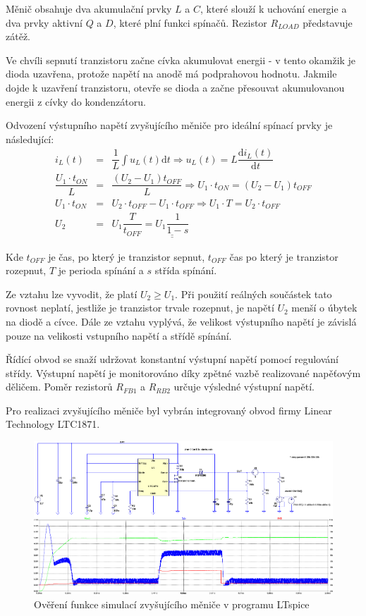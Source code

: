 Měnič obsahuje dva akumulační prvky $L$ a $C$, které slouží k uchování energie a dva prvky aktivní $Q$ a $D$, které plní funkci spínačů. Rezistor $R_{LOAD}$ představuje zátěž.

Ve chvíli sepnutí tranzistoru začne cívka akumulovat energii - v tento okamžik je dioda uzavřena, protože napětí na anodě má podprahovou hodnotu. Jakmile dojde k uzavření tranzistoru, otevře se dioda a začne přesouvat akumulovanou energii z cívky do kondenzátoru.

Odvození výstupního napětí zvyšujícího měniče pro ideální spínací prvky je následující:
\begin{eqnarray}
    i_L(t) &=& \dfrac{1}{L} \int u_L(t) \mathrm{d}t \Rightarrow u_L(t) = L \dfrac{\mathrm{d}i_L(t)}{\mathrm{d}t}
    \nonumber\\
    \dfrac{U_1 \cdot t_{ON}}{L} &=& \dfrac{(U_2 - U_1) t_{OFF}}{L} \Rightarrow U_1 \cdot t_{ON} = (U_2 - U_1) t_{OFF}
    \nonumber\\
    U_1 \cdot t_{ON} &=& U_2 \cdot t_{OFF} - U_1 \cdot t_{OFF} \Rightarrow U_1 \cdot T = U_2 \cdot t_{OFF}
    \nonumber\\
    U_2 &=& U_1 \dfrac{T}{t_{OFF}} = \underline{\underline{U_1 \dfrac{1}{1-s}}}
    \nonumber
\end{eqnarray}

Kde $t_{OFF}$ je čas, po který je tranzistor sepnut, $t_{OFF}$ čas po který je tranzistor rozepnut, $T$ je perioda spínání a $s$ střída spínání.

Ze vztahu lze vyvodit, že platí $U_2 \geq U_1$. Při použití reálných součástek tato rovnost neplatí, jestliže je tranzistor trvale rozepnut, je napětí $U_2$ menší o úbytek na diodě a cívce. Dále ze vztahu vyplývá, že velikost výstupního napětí je závislá pouze na velikosti vstupního napětí a střídě spínání.

Řídící obvod se snaží udržovat konstantní výstupní napětí pomocí regulování střídy. Výstupní napětí je monitorováno díky zpětné vazbě realizované napěťovým děličem. Poměr rezistorů $R_{FB1}$ a $R_{RB2}$ určuje výsledné výstupní napětí.

Pro realizaci zvyšujícího měniče byl vybrán integrovaný obvod firmy Linear Technology LTC1871.

\begin{figure}[H]
    \begin{center}
        \includegraphics[width=\textwidth]{img/boost-sim}
    \end{center}
    \caption{Ověření funkce simulací zvyšujícího měniče v programu LTspice}
\end{figure}

